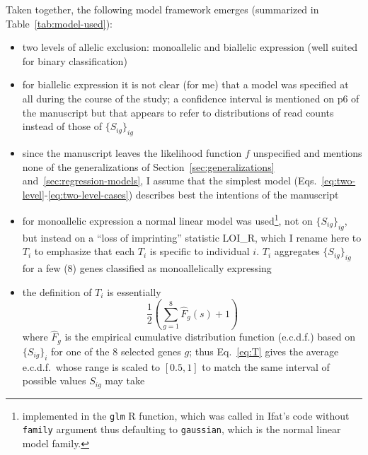 \documentclass[letterpaper]{article}
\begin{document}
Taken together, the following model framework emerges (summarized in
Table~\ref{tab:model-used}):
\begin{itemize}
\item two levels of allelic exclusion: monoallelic and biallelic expression (well suited for binary classification)
\item for biallelic expression it is not clear (for me) that a model was
specified at all during the course of the study;
a confidence interval is mentioned on p6 of the manuscript but that appears to refer to distributions
of read counts instead of those of \(\{S_{ig}\}_{ig}\)
\item since
the manuscript leaves the likelihood function \(f\) unspecified and mentions
none of the generalizations of Section~\ref{sec:generalizations}
and~\ref{sec:regression-models}, I assume that the simplest model
(Eqs.~\ref{eq:two-level}-\ref{eq:two-level-cases}) describes best the
intentions of the manuscript
\item for monoallelic expression a normal linear model was used\footnote{implemented in the
\texttt{glm} R function, which was called in Ifat's code without
\texttt{family} argument thus defaulting to \texttt{gaussian}, which is the
normal linear model family. }, not on \(\{S_{ig}\}_{ig}\), but instead on a ``loss of imprinting'' statistic LOI\_R,
which I rename here to \(T_i\) to emphasize that each \(T_i\) is specific to 
individual \(i\).  \(T_i\) aggregates \(\{S_{ig}\}_{ig}\) for a few (8) genes classified
as monoallelically expressing
\item the definition of \(T_i\) is essentially
\begin{equation}
\label{eq:T}
\frac{1}{2}\left(\sum_{g=1}^8 \hat{F}_g(s) + 1 \right)
\end{equation}
where \(\hat{F}_g\) is the empirical cumulative distribution function
(e.c.d.f.) based on \(\{S_{ig}\}_i\) for one of the 8 selected genes \(g\);
thus Eq.~\ref{eq:T} gives the average e.c.d.f.~whose range is scaled to
\([0.5,1]\) to match the same interval of possible values \(S_{ig}\) may take
\end{itemize}
\end{document}
